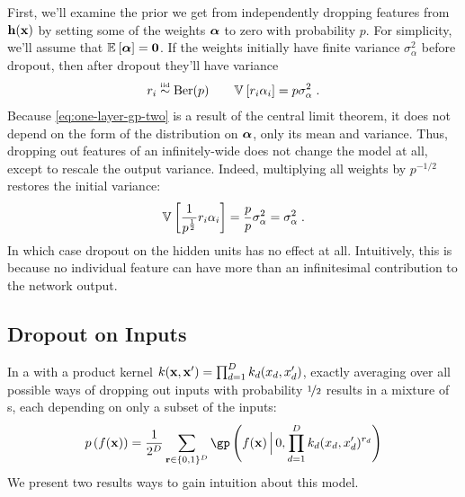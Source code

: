 First, we'll examine the prior we get from independently dropping features from ${\bf{h}}({\bf{x}})$ by setting some of the weights $\boldsymbol{\alpha}$ to zero with probability $p$.
For simplicity, we'll assume that $\mathbb{E}_{} \left[ {\boldsymbol{\alpha}} \right] = {\bf{0}}$.
If the weights initially have finite variance $\sigma^2_{\alpha}$ before dropout, then after dropout they'll have variance
\begin{align}
r_i \overset{\mbox{\tiny iid}}{\sim} \textnormal{Ber}(p)
\qquad
\mathbb{V}_{} \left[ {r_i \alpha_i} \right] = p \sigma_{\alpha}^2 \;.
\end{align}
Because \cref{eq:one-layer-gp-two} is a result of the central limit theorem, it does not depend on the form of the distribution on $\boldsymbol{\alpha}$, only its mean and variance.
Thus, dropping out features of an infinitely-wide \MLP{} does not change the model at all, except to rescale the output variance.
Indeed, multiplying all weights by $p^{-1/2}$ restores the initial variance:
\begin{align}
\mathbb{V}_{} \left[ { \frac{1}{p^\frac{1}{2}} r_i \alpha_i} \right] = \frac{p}{p} \sigma_{\alpha}^2 = \sigma_{\alpha}^2 \;.
\end{align}
In which case dropout on the hidden units has no effect at all.
Intuitively, this is because no individual feature can have more than an infinitesimal contribution to the network output.


\subsection{Dropout on Inputs}

In a \gp{} with a product kernel ${k({\bf{x}}, {\bf{x}}') = \prod_{d=1}^D k_d(x_d, x_d')}$, exactly averaging over all possible ways of dropping out inputs with probability $\nicefrac{1}{2}$ results in a mixture of \gp{}s, each depending on only a subset of the inputs:
\begin{align}
p \left( f(\vx) \right)
= \frac{1}{2^D} \sum_{\vr \in \{0,1\}^D}  \textnormal{\gp} \left(f(\vx) \,\Big|\, 0, \prod_{d=1}^D k_d(x_d, x_d')^{r_d} \right)
\label{eq:dropout-mixture}
\end{align}
We present two results ways to gain intuition about this model.

